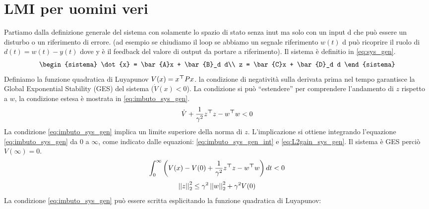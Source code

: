 

\chapter{LMI per uomini veri}

Partiamo dalla definizione generale del sistema con solamente lo spazio di stato senza inut ma solo con un input d che può essere un disturbo o un riferimento di errore. (ad esempio se chiudiamo il loop se abbiamo un segnale riferimento $w(t)$ d può ricoprire il ruolo di $d(t) = w(t) - y(t)$ dove y è il feedback del valore di output da portare a riferimento). Il sistema è definitio in \eqref{eq:sys_gen}.
\begin{equation}
\label{eq:sys_gen}
	\begin{sistema}
	\dot{x} = \bar{A}x + \bar{B}_d d\\
	z       = \bar{C}x + \bar{D}_d d
	\end{sistema}
\end{equation}
Definiamo la funzione quadratica di Luyapunov  $V(x) = x^{{\bm \top}} P x$. la condizione di negatività sulla derivata prima nel tempo garantisce la Global Exponential Stability (GES) del sistema ($\dot{V}(x) < 0$). La condizione si può ``estendere'' per comprendere l'andamento di $z$ rispetto a $w$, la condizione estesa è mostrata in \eqref{eq:imbuto_sys_gen}.
\begin{equation}
\label{eq:imbuto_sys_gen}
	\dot{V} + \dfrac{1}{\gamma^2}z^{{\bm \top}} z - w^{{\bm \top}} w < 0
\end{equation}
La condizione \eqref{eq:imbuto_sys_gen} implica un limite superiore della norma di $z$. L'implicazione si ottiene integrando l'equazione \eqref{eq:imbuto_sys_gen} da $0$ a $\infty$, come indicato dalle equazioni: \eqref{eq:imbuto_sys_gen_int} e \eqref{eq:L2gain_sys_gen}. Il sistema è GES perciò $V(\infty) = 0$. 
\begin{equation}
\label{eq:imbuto_sys_gen_int}
	\int_{0}^{\infty}\left (V(x) - V(0) + \dfrac{1}{\gamma^2}z^{{\bm \top}} z - w^{{\bm \top}} w    \right )dt < 0
\end{equation}
\begin{equation}
\label{eq:L2gain_sys_gen}
	\left \lvert \left \lvert z \right \rvert \right \rvert_2^2 \leq \gamma^2\left \lvert \left \lvert w \right \rvert \right \rvert^2_2 + \gamma^2 V(0)
\end{equation}
La condizione \eqref{eq:imbuto_sys_gen} può essere scritta esplicitando la funzione quadratica di Luyapunov:
